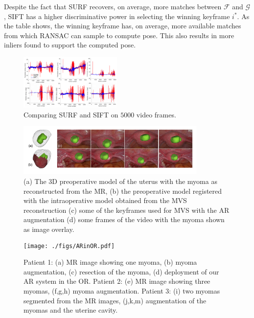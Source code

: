 Despite the fact that SURF recovers, on average, more matches between $\mathcal{F}$ and $\mathcal{G}$, SIFT has a higher discriminative power in selecting the winning keyframe $i^*$. As the table shows, the winning keyframe has, on average, more available matches from which RANSAC can sample to compute pose. This also results in more inliers found to support the computed pose.
\begin{figure}[t]
  \centering
  \includegraphics[width=0.45\textwidth]{./figs/Stability_Features2.pdf}
\caption{Comparing SURF and SIFT on $5000$ video frames.}
\label{fig:SurfVsSift}
\vspace{-5mm}
\end{figure}

\begin{figure}[ht]
  \centering
  \includegraphics[width=0.835\textwidth]{./figs/frames_aug_new.pdf}
\caption{(a) The 3D preoperative model of the uterus with the  myoma as reconstructed from the MR, (b) the preoperative model registered with the intraoperative model obtained from the MVS reconstruction (c) some of the keyframes used for MVS with the AR augmentation  (d) some frames of the video with the myoma shown as image overlay.}
\label{fig:myomas}
\end{figure}
\begin{figure}[ht]
  \centering
  \texttt{[image: ./figs/ARinOR.pdf]}
\caption{Patient 1: (a) MR image showing one myoma, (b) myoma augmentation, (c) resection of the myoma, (d) deployment of our AR system in the OR. Patient 2: (e) MR image showing three myomas, (f,g,h) myoma augmentation. Patient 3: (i) two myomas segmented from the MR images, (j,k,m) augmentation of the myomas and the uterine cavity.}
\label{fig:realOR}
\end{figure}

